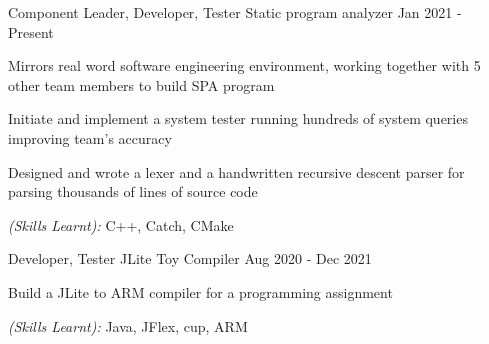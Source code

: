 

\begin{cventries}

  \cventry
    {Component Leader, Developer, Tester} %
    {Static program analyzer} %
    {} %
    {Jan 2021 - Present} %
    {
      \begin{cvitems} %
        \item {Mirrors real word software engineering environment, working together with 5 other team members to build SPA program}
        \item {Initiate and implement a system tester running hundreds of system queries improving team's accuracy}
        \item {Designed and wrote a lexer and a handwritten recursive descent parser for parsing thousands of lines of source code}
        \item {\textit{(Skills Learnt):} C++, Catch, CMake}
      \end{cvitems}
    }


  \cventry
    {Developer, Tester} %
    {JLite Toy Compiler} %
    {} %
    {Aug 2020 - Dec 2021} %
    {
      \begin{cvitems} %
        \item {Build a JLite to ARM compiler for a programming assignment}
        \item {\textit{(Skills Learnt):} Java, JFlex, cup, ARM}
      \end{cvitems}
    }



\end{cventries}
